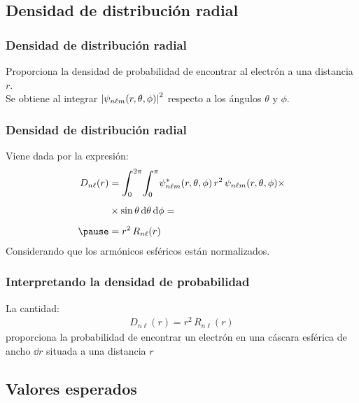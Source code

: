 \documentclass[12pt]{beamer}
\begin{document}
\subsection{Densidad de distribución radial}

\begin{frame}
\frametitle{Densidad de distribución radial}
Proporciona la densidad de probabilidad de encontrar al electrón a una distancia $r$.
\\
\bigskip
\pause
Se obtiene al integrar $\abs{\psi_{n \ell m} (r, \theta, \phi)}^{2}$ respecto a los ángulos $\theta$ y $\phi$.
\end{frame}
\begin{frame}
\frametitle{Densidad de distribución radial}
Viene dada por la expresión:
\pause
\begin{eqnarray*}
\begin{aligned}
D_{n \ell} (r) &= \scaleint{6ex}_{\bs 0}^{2 \pi} \scaleint{6ex}_{\bs 0}^{\pi} \psi_{n \ell m}^{*} (r, \theta, \phi) \, r^{2} \, \psi_{n \ell m} (r, \theta, \phi) \times \\[0.5em]
&\times\sin \theta \dd{\theta} \dd{\phi} = \\[0.5em] \pause
&= r^{2} \, R_{n \ell} (r)
\end{aligned}
\end{eqnarray*}
\pause
Considerando que los armónicos esféricos están normalizados.
\end{frame}
\begin{frame}
\frametitle{Interpretando la densidad de probabilidad}
La cantidad:
\pause
\begin{align*}
D_{n \ell} (r) = r^{2} \, R_{n \ell} (r)
\end{align*}
\pause
proporciona la probabilidad de encontrar un electrón en una cáscara esférica de ancho $\dd{r}$ situada a una distancia $r$
\end{frame}

\subsection{Valores esperados}
\end{document}
